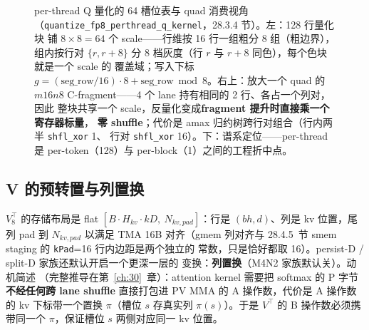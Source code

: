\begin{figure}[H]
\caption{per-thread Q 量化的 64 槽位表与 quad 消费视角
（\texttt{quantize\_\allowbreak{}fp8\_\allowbreak{}perthread\_\allowbreak{}q\_kernel}，28.3.4 节）。左：128 行量化块
铺 $8\times8=64$ 个 scale——行维按 16 行一组粗分 8 组（粗边界），组内按行对
$\{r,r+8\}$ 分 8 档灰度（行 $r$ 与 $r{+}8$ 同色），每个色块就是一个 scale 的
覆盖域；写入下标 $g=(\text{seg\_row}/16)\cdot 8+\text{seg\_row}\bmod 8$。右上：放大一个
quad 的 $m16n8$ C-fragment——4 个 lane 持有相同的 2 行、各占一个列对，因此
整块共享一个 scale，反量化变成\textbf{fragment 提升时直接乘一个寄存器标量}，
\textbf{零 shuffle}；代价是 amax 归约树跨行对组合（行内两半 \texttt{shfl\_xor} 1、
行对 \texttt{shfl\_xor} 16）。下：谱系定位——per-thread 是 per-token（128）与
per-block（1）之间的工程折中点。}
\label{fig:28-perthread-slots}
\end{figure}

\subsection{V 的预转置与列置换}\label{sec:28-vtperm}

$V_8^{\top}$ 的存储布局是 flat $[B\cdot H_{kv}\cdot kD,\ N_{kv,pad}]$：行是
$(bh, d)$、列是 kv 位置，尾列 pad 到 $N_{kv,pad}$ 以满足 TMA 16B 对齐（gmem
列对齐与 28.4.5~节 smem staging 的 \texttt{kPad}=16 行内边距是两个独立的
常数，只是恰好都取 16）。persist-D / split-D 家族还默认开启一个更深一层的
变换：\textbf{列置换}（M4N2 家族默认关）。动机简述
（完整推导在第~\ref{ch:30}~章）：attention kernel 需要把 softmax 的 P 字节
\textbf{不经任何跨 lane shuffle} 直接打包进 PV MMA 的 A 操作数，代价是 A 操作数
的 kv 下标带一个置换 $\pi$（槽位 $s$ 存真实列 $\pi(s)$）。于是 $V^{\top}$ 的
B 操作数必须携带同一个 $\pi$，保证槽位 $s$ 两侧对应同一 kv 位置。

